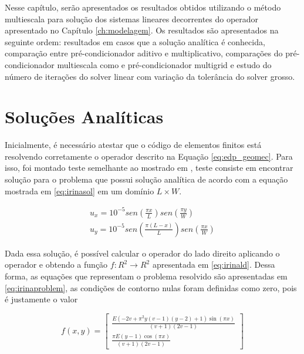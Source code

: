 Nesse capítulo, serão apresentados os resultados obtidos utilizando o método multiescala para solução dos sistemas lineares decorrentes do operador apresentado no Capítulo \ref{ch:modelagem}. Os resultados são apresentados na seguinte ordem: resultados em casos que a solução analítica é conhecida,
comparação entre pré-condicionador aditivo e multiplicativo, comparações do pré-condicionador multiescala como e pré-condicionador multigrid e estudo do número de iterações do solver linear com variação da tolerância do solver grosso.



\section{Soluções Analíticas}

Inicialmente, é necessário atestar que o código de elementos finitos está resolvendo corretamente o operador descrito na Equação \ref{eq:edp_geomec}. 
Para isso, foi montado teste semelhante ao mostrado em \cite{irina}, teste consiste em encontrar solução para o problema que possui solução analítica de acordo com a equação mostrada em \ref{eq:irinasol} 
em um domínio $L \times W$.


\begin{equation} \label{eq:irinasol}
  \begin{aligned}
  u_x = 10^{-5} sen(\frac{\pi x}{L}) sen(\frac{\pi y}{W})  \\
  u_y = 10^{-5} sen(\frac{\pi (L-x)}{L}) sen(\frac{\pi x}{W})
  \end{aligned}
\end{equation}

Dada essa solução, é possível calcular o operador do lado direito aplicando o operador e obtendo a função $f: R^2 \rightarrow R^2$ apresentada em \ref{eq:irinald}. Dessa forma, as equações que representam o problema resolvido são apresentadas em \ref{eq:irinaproblem}, as condições de contorno nulas foram definidas como zero, pois é justamente o valor 

\begin{equation} \label{eq:irinald}
f(x, y) = 
\left[\begin{matrix}\frac{E \left(- 2 v + \pi^{2} y \left(v - 1\right) \left(y - 2\right) + 1\right) \sin{\left (\pi x \right )}}{\left(v + 1\right) \left(2 v - 1\right)} \\ \frac{\pi E \left(y - 1\right) \cos{\left (\pi x \right )}}{\left(v + 1\right) \left(2 v - 1\right)}\end{matrix}\right]
\end{equation}


